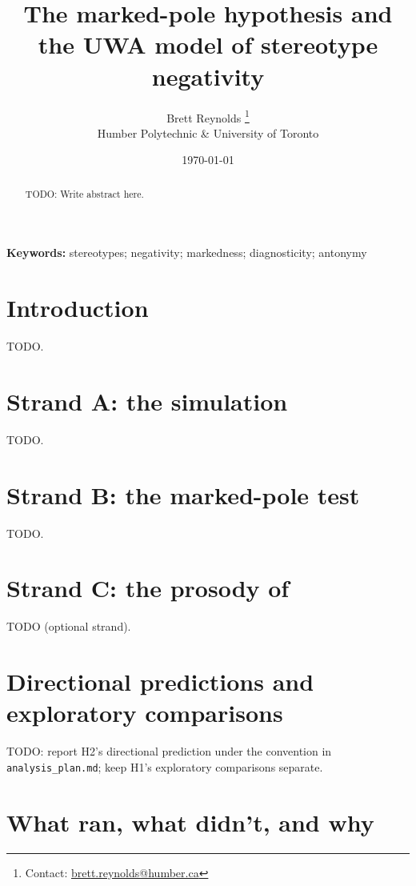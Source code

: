 \documentclass[12pt]{article}
\title{The marked-pole hypothesis and the UWA model of stereotype negativity}
\author{Brett Reynolds \orcidlink{0000-0003-0073-7195}%
\thanks{Contact: \href{mailto:brett.reynolds@humber.ca}{brett.reynolds@humber.ca}}\\
Humber Polytechnic \& University of Toronto}
\date{\today}
\begin{document}
\maketitle

\begin{abstract}
TODO: Write abstract here.
\end{abstract}

\noindent\textbf{Keywords:} stereotypes; negativity; markedness; diagnosticity; antonymy


\section{Introduction}

TODO.

\section{Strand A: the simulation}
\label{sec:simulation}

TODO.

\section{Strand B: the marked-pole test}
\label{sec:empirical}

TODO.

\section{Strand C: the prosody of }
\label{sec:prosody}

TODO (optional strand).

\section{Directional predictions and exploratory comparisons}
\label{sec:falsification}

TODO: report H2's directional prediction under the convention in \texttt{analysis\_plan.md}; keep H1's exploratory comparisons separate.

\section{What ran, what didn't, and why}
\label{sec:what-ran}
\end{document}
